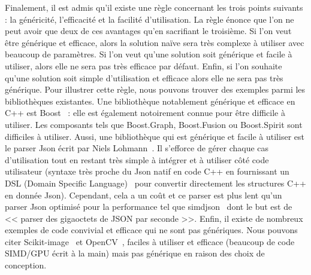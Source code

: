 Finalement, il est admis qu'il existe une règle concernant les trois points suivants : la généricité, l'efficacité et la
facilité d'utilisation. La règle énonce que l'on ne peut avoir que deux de ces avantages qu'en sacrifiant le troisième.
Si l'on veut être générique et efficace, alors la solution naïve sera très complexe à utiliser avec beaucoup de
paramètres. Si l'on veut qu'une solution soit générique et facile à utiliser, alors elle ne sera pas très efficace par
défaut. Enfin, si l'on souhaite qu'une solution soit simple d'utilisation et efficace alors elle ne sera pas très
générique. Pour illustrer cette règle, nous pouvons trouver des exemples parmi les bibliothèques existantes. Une
bibliothèque notablement générique et efficace en C++ est Boost~\parencite{boost.2021} : elle est également notoirement
connue pour être difficile à utiliser. Les composants tels que Boost.Graph, Boost.Fusion ou Boost.Spirit sont difficiles
à utiliser. Aussi, une bibliothèque qui est générique et facile à utiliser est le parser Json écrit par Niels
Lohmann~\parencite{nlohmann.2021.json}. Il s'efforce de gérer chaque cas d'utilisation tout en restant très simple à
intégrer et à utiliser côté code utilisateur (syntaxe très proche du Json natif en code C++ en fournissant un DSL
(Domain Specific Language)~\parencite{deursen.2000.DSL} pour convertir directement les structures C++ en donnée Json).
Cependant, cela a un coût et ce parser est plus lent qu'un parser Json optimisé pour la performance tel que
simdjson~\parencite{lemire.2021.simdjson} dont le but est de << parser des gigaoctets de JSON par seconde >>. Enfin, il
existe de nombreux exemples de code convivial et efficace qui ne sont pas génériques. Nous pouvons citer
Scikit-image~\parencite{vanderwalt.2014.skimage} et OpenCV~\parencite{bradski.2000.opencv}, faciles à utiliser et
efficace (beaucoup de code SIMD/GPU écrit à la main) mais pas générique en raison des choix de conception.

